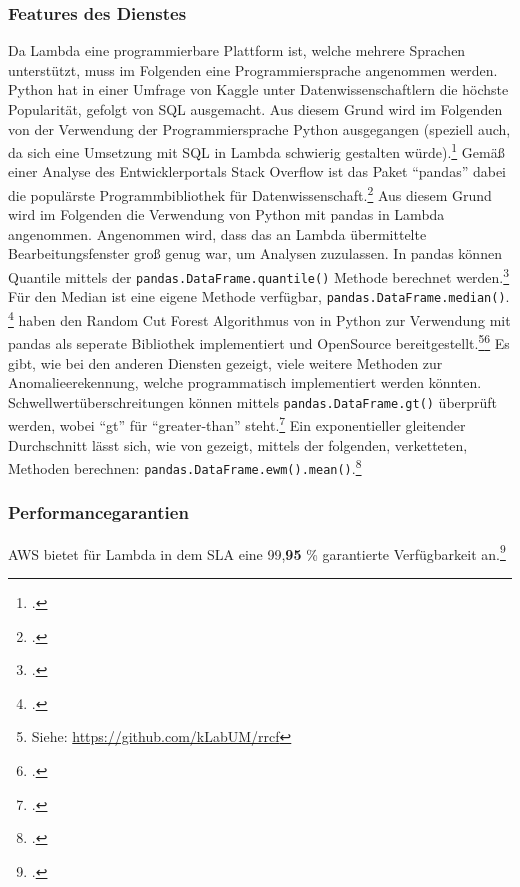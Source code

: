 \subsubsection{Features des Dienstes}
Da Lambda eine programmierbare Plattform ist, welche mehrere Sprachen unterstützt, muss im Folgenden eine Programmiersprache angenommen werden. Python hat in einer Umfrage von Kaggle unter Datenwissenschaftlern die höchste Popularität, gefolgt von \ac{SQL} ausgemacht. Aus diesem Grund wird im Folgenden von der Verwendung der Programmiersprache Python ausgegangen (speziell auch, da sich eine Umsetzung mit \ac{SQL} in Lambda schwierig gestalten würde).\footcite[Vgl.][]{Hayes.2020} Gemäß einer Analyse des Entwicklerportals Stack Overflow ist das Paket \enquote{pandas} dabei die populärste Programmbibliothek für Datenwissenschaft.\footcite[Vgl.][]{Robinson.2017} Aus diesem Grund wird im Folgenden die Verwendung von Python mit pandas in Lambda angenommen. Angenommen wird, dass das an Lambda übermittelte Bearbeitungsfenster groß genug war, um Analysen zuzulassen.
\newcommand{\pandasmethod}[1]{\texttt{pandas.#1()}}
In pandas können Quantile mittels der \pandasmethod{DataFrame.quantile} Methode berechnet werden.\footcite[Vgl.][]{o.V..o.J.c} Für den Median ist eine eigene Methode verfügbar, \pandasmethod{DataFrame.median}. \footcite[Vgl.][]{o.V..o.J.d}
\citeauthor{Bartos.2019} haben den Random Cut Forest Algorithmus von \citeauthor{Guha.2016} in Python zur Verwendung mit pandas als seperate Bibliothek implementiert und OpenSource bereitgestellt.\footnote{Siehe: \url{https://github.com/kLabUM/rrcf}}\nzitat\footcite[Vgl.][]{Bartos.2019} Es gibt, wie bei den anderen Diensten gezeigt, viele weitere Methoden zur Anomalieerekennung, welche programmatisch implementiert werden könnten.
Schwellwertüberschreitungen können mittels \pandasmethod{DataFrame.gt} überprüft werden, wobei \enquote{gt} für \enquote{greater-than} steht.\footcite[Vgl.][]{o.V..o.J.e}
Ein exponentieller gleitender Durchschnitt lässt sich, wie von \citeauthor{Sharma.2019} gezeigt, mittels der folgenden, verketteten, Methoden berechnen: \pandasmethod{DataFrame.ewm().mean}.\footcite[Vgl.][]{Sharma.2019} 

\subsubsection{Performancegarantien}
\ac{AWS} bietet für Lambda in dem \ac{SLA} eine 99,\textbf{95} \% garantierte Verfügbarkeit an.\footcite[Vgl.][]{AmazonWebServicesInc..2019d}

